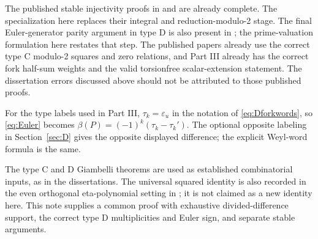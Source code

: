 \documentclass[11pt,letterpaper]{article}
\theoremstyle{remark}
\newcommand{\eps}{\varepsilon}
\begin{document}
The published stable injectivity proofs in \cite[Theorem 16]{KumarRogers} and \cite[Theorem 3.8]{KumarXie} are already complete. The specialization here replaces their integral and reduction-modulo-2 stage. The final Euler-generator parity argument in type D is also present in \cite[Theorem 3.8]{KumarXie}; the prime-valuation formulation here restates that step. The published papers already use the correct type C modulo-2 squares and zero relations, and Part III already has the correct fork half-sum weights and the valid torsionfree scalar-extension statement. The dissertation errors discussed above should not be attributed to those published proofs.

For the type labels used in Part III, $\tau_k=\eps_u$ in the notation of \eqref{eq:Dforkwords}, so \eqref{eq:Euler} becomes $\beta(P)=(-1)^k(\tau_k-\tau_k')$. The optional opposite labeling in Section~\ref{sec:D} gives the opposite displayed difference; the explicit Weyl-word formula is the same.

The type C and D Giambelli theorems are used as established combinatorial inputs, as in the dissertations. The universal squared identity is also recorded in the even orthogonal eta-polynomial setting in \cite[eq.~(33)]{BKTeven}; it is not claimed as a new identity here. This note supplies a common proof with exhaustive divided-difference support, the correct type D multiplicities and Euler sign, and separate stable arguments.
\end{document}
